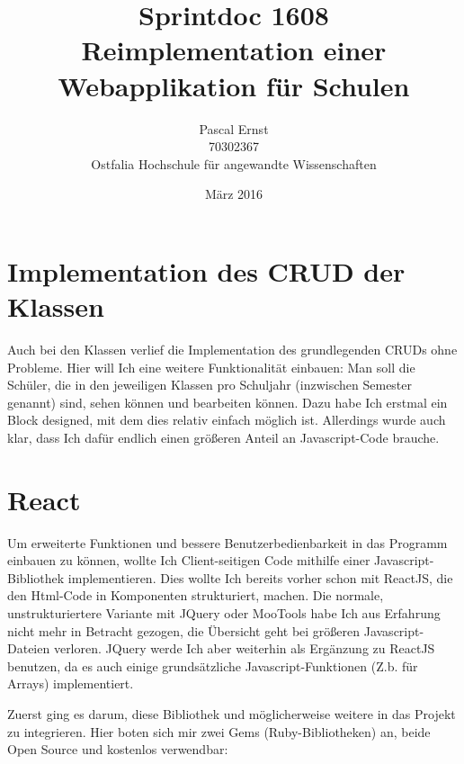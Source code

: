 \documentclass[a4paper,10pt]{scrartcl}
\begin{document}
\title{Sprintdoc 1608 \\
  Reimplementation einer Webapplikation für Schulen}
\author{Pascal Ernst\\
  70302367 \\
  Ostfalia Hochschule für angewandte Wissenschaften}
\date{März 2016}
\maketitle

\newpage

\section{Implementation des CRUD der Klassen}

  Auch bei den Klassen verlief die Implementation des grundlegenden CRUDs ohne
  Probleme.
  Hier will Ich eine weitere Funktionalität einbauen:
  Man soll die Schüler, die in den jeweiligen Klassen pro Schuljahr (inzwischen
  Semester genannt) sind, sehen können und bearbeiten können.
  Dazu habe Ich erstmal ein Block designed, mit dem dies relativ einfach möglich
  ist.
  Allerdings wurde auch klar, dass Ich dafür endlich einen größeren Anteil an
  Javascript-Code brauche.

\section{React}

  Um erweiterte Funktionen und bessere Benutzerbedienbarkeit in das Programm
  einbauen zu können, wollte Ich Client-seitigen Code mithilfe einer
  Javascript-Bibliothek implementieren.
  Dies wollte Ich bereits vorher schon mit ReactJS, die den Html-Code in
  Komponenten strukturiert, machen.
  Die normale, unstrukturiertere Variante mit JQuery oder MooTools habe Ich aus
  Erfahrung nicht mehr in Betracht gezogen, die Übersicht geht bei größeren
  Javascript-Dateien verloren.
  JQuery werde Ich aber weiterhin als Ergänzung zu ReactJS benutzen, da es auch
  einige grundsätzliche Javascript-Funktionen (Z.b. für Arrays) implementiert.

  Zuerst ging es darum, diese Bibliothek und möglicherweise weitere in das
  Projekt zu integrieren.
  Hier boten sich mir zwei Gems (Ruby-Bibliotheken) an, beide Open Source und
  kostenlos verwendbar:
\end{document}
